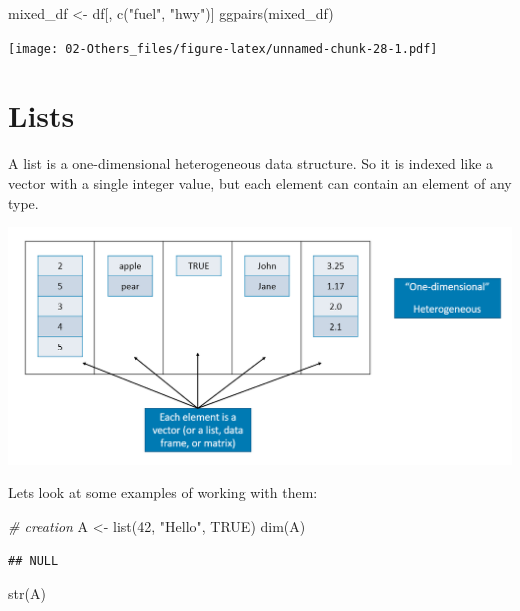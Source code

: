 \documentclass[
]{book}
\newenvironment{Shaded}{\begin{snugshade}}{\end{snugshade}}
\newcommand{\CommentTok}[1]{\textcolor[rgb]{0.56,0.35,0.01}{\textit{#1}}}
\newcommand{\ConstantTok}[1]{\textcolor[rgb]{0.00,0.00,0.00}{#1}}
\newcommand{\DecValTok}[1]{\textcolor[rgb]{0.00,0.00,0.81}{#1}}
\newcommand{\FunctionTok}[1]{\textcolor[rgb]{0.00,0.00,0.00}{#1}}
\newcommand{\NormalTok}[1]{#1}
\newcommand{\OtherTok}[1]{\textcolor[rgb]{0.56,0.35,0.01}{#1}}
\newcommand{\StringTok}[1]{\textcolor[rgb]{0.31,0.60,0.02}{#1}}
\begin{document}
\begin{Shaded}
\begin{Highlighting}[]
\NormalTok{mixed\_df }\OtherTok{\textless{}{-}}\NormalTok{ df[, }\FunctionTok{c}\NormalTok{(}\StringTok{"fuel"}\NormalTok{, }\StringTok{"hwy"}\NormalTok{)]}
\FunctionTok{ggpairs}\NormalTok{(mixed\_df)}
\end{Highlighting}
\end{Shaded}

\texttt{[image: 02-Others\_files/figure-latex/unnamed-chunk-28-1.pdf]}

\hypertarget{lists}{%
\section{Lists}\label{lists}}

A list is a one-dimensional heterogeneous data structure. So it is indexed like a vector with a single integer value, but each element can contain an element of any type.

\includegraphics[width=14.5in]{png/List}

Lets look at some examples of working with them:

\begin{Shaded}
\begin{Highlighting}[]
\CommentTok{\# creation}
\NormalTok{A }\OtherTok{\textless{}{-}} \FunctionTok{list}\NormalTok{(}\DecValTok{42}\NormalTok{, }\StringTok{"Hello"}\NormalTok{, }\ConstantTok{TRUE}\NormalTok{)}
\FunctionTok{dim}\NormalTok{(A)}
\end{Highlighting}
\end{Shaded}

\begin{verbatim}
## NULL
\end{verbatim}

\begin{Shaded}
\begin{Highlighting}[]
\FunctionTok{str}\NormalTok{(A)}
\end{Highlighting}
\end{Shaded}
\end{document}

